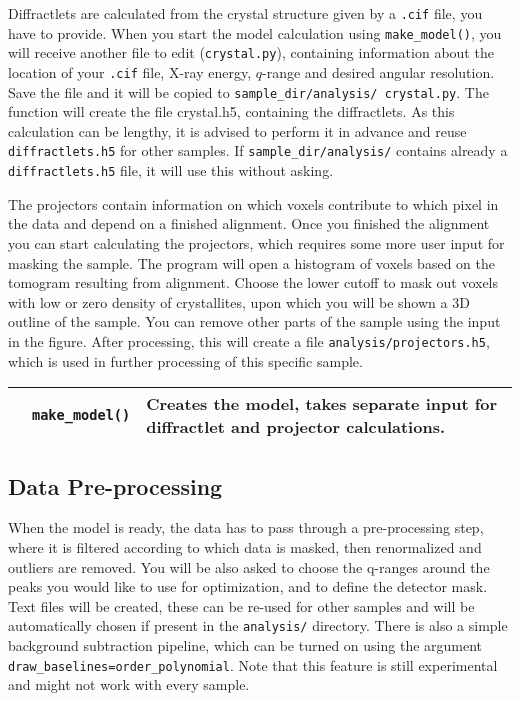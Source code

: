 Diffractlets are calculated from the crystal structure given by a \texttt{.cif} file, you have to provide.
When you start the model calculation using \texttt{make\_model()}, you will receive another file to edit (\texttt{crystal.py}), containing
information about the location of your \texttt{.cif} file, X-ray energy, $q$-range and desired angular resolution.
Save the file and it will be copied to \texttt{sample\_dir/analysis/ crystal.py}.
The function will create the file crystal.h5, containing the diffractlets. As this calculation can be lengthy,
it is advised to perform it in advance and reuse \texttt{diffractlets.h5} for other samples. If \texttt{sample\_dir/analysis/} contains
already a \texttt{diffractlets.h5} file, it will use this without asking.



The projectors contain information on which voxels contribute to which pixel in the data and
depend on a finished alignment. Once you finished the alignment you can start calculating the projectors,
which requires some more user input for masking the sample. The program will open a histogram of voxels based on the
tomogram resulting from alignment. Choose the lower cutoff to mask out voxels with low or zero density of crystallites,
upon which you will be shown a 3D outline of the sample.
You can remove other parts of the sample using the input in the figure.
After processing, this will create a file \texttt{analysis/projectors.h5}, which is used in further processing of this specific sample.

\begin{table}[h!]
    \centering
    \begin{tabular}{| l | l | l |} 
        \hline
         & \texttt{make\_model()} & Creates the model, takes separate input for diffractlet and projector calculations.\\
      \hline
     \end{tabular}
\end{table}

\subsection{Data Pre-processing}

When the model is ready, the data has to pass through a pre-processing step, where it is filtered according to
which data is masked, then renormalized and outliers are removed. You will be also asked to choose the q-ranges
around the peaks you would like to use for optimization, and to define the detector mask.
Text files will be created, these can be re-used for other samples and will be automatically chosen if present
in the \texttt{analysis/} directory.
There is also a simple background subtraction pipeline, which can be turned on using the argument \texttt{draw\_baselines=order\_polynomial}. 
Note that this feature is still experimental and might not work with every sample.

